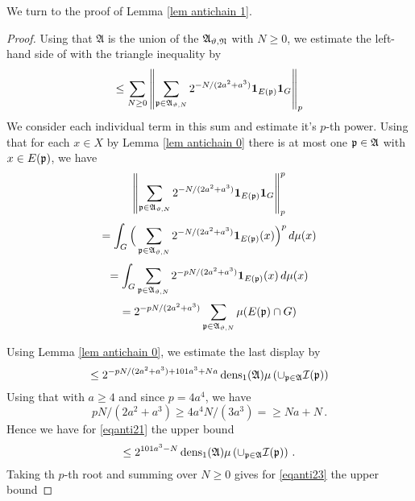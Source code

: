 {We turn to the proof of Lemma \ref{lem antichain 1}.




\begin{proof}


Using that $\mathfrak{A}$ is the union of the
$\mathfrak{A_{\vartheta,N}}$ with $N\ge 0$,
we estimate the left-hand side of
with the triangle inequality by
\begin{equation}\label{eqanti23}
\le \sum_{N\ge 0} \left\|\sum_{\mathfrak p\in \mathfrak{A}_{\vartheta,N}} 2^{-N/(2a^2+a^3)}\mathbf{1}_{E(\mathfrak p)} \mathbf{1}_G\right\|_{p}
\end{equation}
We consider each individual term in this sum and estimate it's $p$-th power.
   Using that for each $x\in X$  by Lemma \ref{lem antichain 0} there is at most one $\mathfrak p\in \mathfrak{A}$ with $x\in E(\mathfrak p)$,
 we have
 \begin{equation}
     \left\|\sum_{\mathfrak p\in \mathfrak{A}_{\vartheta,N}} 2^{-N/(2a^2+a^3)}\mathbf{1}_{E(\mathfrak p)} \mathbf{1}_G\right\|_{p}^p
 \end{equation}
\begin{equation}
    =\int_G\Big(\sum_{\mathfrak p\in \mathfrak{A}_{\vartheta,N}}2^{-N/(2a^2+a^3)}\mathbf{1}_{E(\mathfrak p)}(x)\Big)^p\, d\mu(x)
\end{equation}
\begin{equation}
  =   \int _G\sum_{\mathfrak p\in\mathfrak{A}_{\vartheta,N}}2^{-pN/(2a^2+a^3)}\mathbf{1}_{E(\mathfrak p)}(x)\, d\mu(x)
\end{equation}
\begin{equation}
  =   2^{-pN/(2a^2+a^3)} \sum_{\mathfrak p\in\mathfrak{A}_{\vartheta,N}}\mu(E(\mathfrak p)\cap G)
\end{equation}

Using Lemma \ref{lem antichain 0}, we estimate the last display by
\begin{equation}\label{eqanti21}
    \le  2^{-pN/(2a^2+a^3)+101a^3+Na}\operatorname{\operatorname{dens}}_1(\mathfrak{A})\mu\left(\cup_{\mathfrak p\in\mathfrak{A}}\mathcal{I}(\mathfrak p)\right)
\end{equation}
Using that with $a\ge 4$ and since $p = 4a^4$, we have
\begin{equation}
    pN/(2a^2+a^3)\ge
    4a^4N/(3a^3)= \ge Na+N\, .
\end{equation}
Hence we have for \eqref{eqanti21} the upper bound
\begin{equation}\label{eqanti22}
\le  2^{101a^3-N}\operatorname{\operatorname{dens}}_1(\mathfrak{A})\mu\left(\cup_{\mathfrak p\in\mathfrak{A}}\mathcal{I}(\mathfrak p)\right)\, .
\end{equation}
Taking th $p$-th root and summing over $N\ge 0$ gives for \eqref{eqanti23} the upper bound


\end{proof}}
